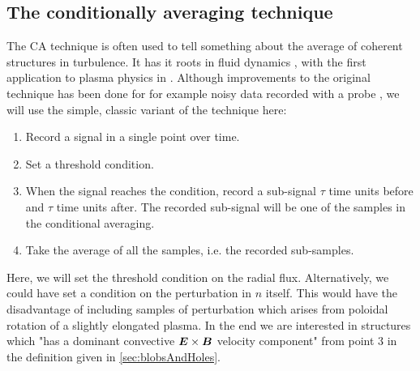 \subsection{The conditionally averaging technique}
%
The CA technique is often used to tell something about the average of coherent structures in turbulence.
It has it roots in fluid dynamics \cite{Kovasznay1970}, with the first application to plasma physics in \cite{Huld1990}. Although improvements to the original technique has been done for for example noisy data recorded with a probe \cite{Teliban2007}, we will use the simple, classic variant of the technique here:
%
\begin{algorithm}
\begin{enumerate}
    \item Record a signal in a single point over time.
    \item Set a threshold condition.
    \item When the signal reaches the condition, record a sub-signal $\tau$ time units before and $\tau$ time units after.
        The recorded sub-signal will be one of the samples in the conditional averaging.
    \item Take the average of all the samples, i.e. the recorded sub-samples.
\end{enumerate}
\end{algorithm}
%
Here, we will set the threshold condition on the radial flux.
Alternatively, we could have set a condition on the perturbation in $n$ itself.
This would have the disadvantage of including samples of perturbation which arises from poloidal rotation of a slightly elongated plasma.
In the end we are interested in structures which "has a dominant convective $\boldsymbol{E}\times\boldsymbol{B}$ velocity component" from point $3$ in the definition given in \cref{sec:blobsAndHoles}.

